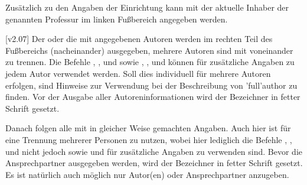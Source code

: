 \begin{DeclareEntity}{}
\begin{Declaration}
  {}
\printdeclarationlist

Zusätzlich zu den Angaben der Einrichtung kann mit  der 
aktuelle Inhaber der genannten Professur im linken Fußbereich angegeben werden.
\end{Declaration}

\begin{Declaration}
  {}
\begin{Declaration}
  {}
\begin{Declaration}
  {}
\begin{Declaration}
  {}
\begin{Declaration}
  {}
\begin{Declaration}
  {}
\begin{Declaration}
  {}
\begin{Declaration}
  {}
\printdeclarationlist

[v2.07]
Der oder die mit  angegebenen Autoren werden im rechten Teil des 
Fußbereichs (nacheinander) ausgegeben, mehrere Autoren sind mit  
voneinander zu trennen. Die Befehle , , 
 und  sowie , , 
und  können für zusätzliche Angaben zu jedem Autor verwendet 
werden. Soll dies individuell für mehrere Autoren erfolgen, sind Hinweise zur 
Verwendung bei der Beschreibung von \Macro'full'{author} zu finden. Vor der 
Ausgabe aller Autoreninformationen wird der Bezeichner  in 
fetter Schrift gesetzt. 

Danach folgen alle mit  in gleicher Weise gemachten 
Angaben. Auch hier ist  für eine Trennung mehrerer Personen zu 
nutzen, wobei hier lediglich die Befehle , , 
 und  nicht jedoch  sowie 
 und  für zusätzliche Angaben zu verwenden 
sind. Bevor die Ansprechpartner ausgegeben werden, wird der Bezeichner 
 in fetter Schrift gesetzt. Es ist natürlich auch 
möglich nur Autor(en) oder Ansprechpartner anzugeben.
\end{Declaration}
\end{Declaration}
\end{Declaration}
\end{Declaration}
\end{Declaration}
\end{Declaration}
\end{Declaration}
\end{Declaration}


\end{DeclareEntity}
